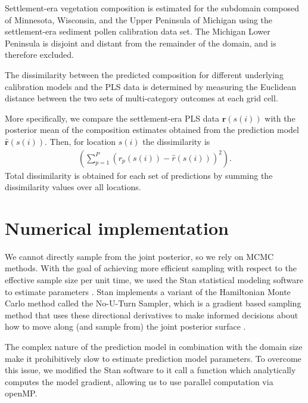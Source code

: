 \documentclass[12pt]{article}
\begin{document}
Settlement-era vegetation composition is estimated for the subdomain
composed of Minnesota, Wisconsin, and the Upper Peninsula of Michigan
using the settlement-era sediment pollen calibration data set. The
Michigan Lower Peninsula is disjoint and distant from the remainder of
the domain, and is therefore excluded. 

The dissimilarity between the predicted composition for different
underlying calibration models and the PLS data is determined by
measuring the Euclidean distance between the two sets of
multi-category outcomes at each grid cell.

More specifically, we compare the settlement-era PLS data
$\bm{r}(s(i))$ with the posterior mean of the composition estimates
obtained from the prediction model $\hat{\bm{r}}(s(i))$. Then, for
location $s(i)$ the dissimilarity is
\begin{align*}
\left( \sum_{p=1}^{P} (r_p(s(i)) - \hat{r}(s(i)))^2 \right).
\end{align*}
Total dissimilarity is obtained for each set of predictions by summing
the dissimilarity values over all locations.

\section{Numerical implementation}

We cannot directly sample from the joint posterior, so we rely on MCMC
methods. With the goal of achieving more efficient sampling with
respect to the effective sample size per unit time, we used the Stan
statistical modeling software to estimate parameters
\citep{stan-software:2014}. Stan implements a variant of the
Hamiltonian Monte Carlo method called the No-U-Turn Sampler, which is
a gradient based sampling method that uses these directional
derivatives to make informed decisions about how to move along (and
sample from) the joint posterior surface \citep{hoffman2011nuts}. 

The complex nature of the prediction model in combination with the
domain size make it prohibitively slow to estimate prediction model
parameters. To overcome this issue, we modified the Stan software to
it call a function which analytically computes the model gradient,
allowing us to use parallel computation via openMP.

\end{document}
